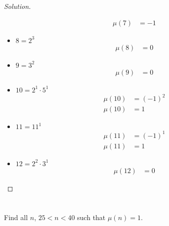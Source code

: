 \documentclass[11pt]{article}
\newenvironment{myproblem}[1][Problem]{\begin{trivlist}
    \item[\hskip \labelsep {\bfseries #1.}]}{\end{trivlist}}
\newenvironment{solution}
  {\renewcommand\qedsymbol{$~$}\begin{proof}[Solution]$ $\par\nobreak\ignorespaces}
  {\end{proof}}
\begin{document}
\begin{solution}
\begin{itemize}
\begin{align*}
                  \mu(7) & = -1
              \end{align*}
        \item[\textbf{8:}]
              $8= 2^3$
              \begin{align*}
                  \mu(8) & = 0
              \end{align*}
        \item[\textbf{9:}]
              $9=3^2$
              \begin{align*}
                  \mu(9) & = 0
              \end{align*}
        \item[\textbf{10:}]
              $10=2^1 \cdot 5^1$
              \begin{align*}
                  \mu(10) & = (-1)^2 \\
                  \mu(10) & = 1
              \end{align*}
        \item[\textbf{11:}]
              $11 = 11^1$
              \begin{align*}
                  \mu(11) & = (-1)^1 \\
                  \mu(11) & = 1
              \end{align*}
        \item[\textbf{12:}]
              $12 = 2^2 \cdot 3^1$
              \begin{align*}
                  \mu(12) & = 0
              \end{align*}
    \end{itemize}
\end{solution}



\section{}
\begin{myproblem}
    Find all $n$, $25<n<40$ such that $\mu(n) =1$.
\end{myproblem}
\end{document}

